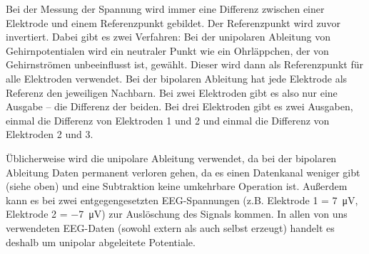 \documentclass[10pt]{article}
\begin{document}
Bei der Messung der Spannung wird immer eine Differenz zwischen einer Elektrode und einem Referenzpunkt gebildet.
Der Referenzpunkt wird zuvor invertiert.
Dabei gibt es zwei Verfahren: Bei der unipolaren Ableitung von Gehirnpotentialen wird ein neutraler Punkt wie ein Ohrläppchen, der von Gehirnströmen unbeeinflusst ist, gewählt. 
Dieser wird dann als Referenzpunkt für alle Elektroden verwendet.
Bei der bipolaren Ableitung hat jede Elektrode als Referenz den jeweiligen Nachbarn.
Bei zwei Elektroden gibt es also nur eine Ausgabe -- die Differenz der beiden.
Bei drei Elektroden gibt es zwei Ausgaben, einmal die Differenz von Elektroden 1 und 2 und einmal die Differenz von Elektroden 2 und 3. \cite{EEGHausarbeit}

Üblicherweise wird die unipolare Ableitung verwendet, da bei der bipolaren Ableitung Daten permanent verloren gehen, da es einen Datenkanal weniger gibt (siehe oben) und eine Subtraktion keine umkehrbare Operation ist.
Außerdem kann es bei zwei entgegengesetzten EEG-Spannungen (z.B. Elektrode 1 = \SI{7}{\micro\volt}, Elektrode 2 = \SI{-7}{\micro\volt}) zur Auslöschung des Signals kommen. \cite{EEGHausarbeit}
In allen von uns verwendeten EEG-Daten (sowohl extern als auch selbst erzeugt) handelt es deshalb um unipolar abgeleitete Potentiale.


\end{document}

